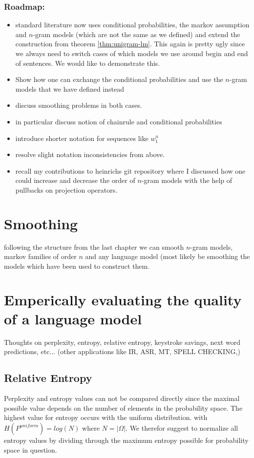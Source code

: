 \documentclass[•]{book}
\begin{document}
\subsection{Roadmap:}
\begin{itemize}
\item standard literature now uses conditional probabilities, the markov assumption and $n$-gram models (which are not the same as we defined) and extend the construction from theorem \ref{thm:unigram-lm}. This again is pretty ugly since we always need to switch cases of which models we use around begin and end of sentences. We would like to demonstrate this.
\item Show how one can exchange the conditional probabilities and use the $n$-gram models that we have defined instead
\item discuss smoothing problems in both cases.
\item in particular discuss notion of chainrule and conditional probabilities
\item introduce shorter notation for sequences like $w_1^n$
\item resolve slight notation inconsistencies from above. 
\item recall my contributions to heinrichs git repository where I discussed how one could increase and decrease the order of $n$-gram models with the help of pullbacks on projection operators. 
\end{itemize}

\chapter{Smoothing}
following the structure from the last chapter we can smooth $n$-gram models, markov families of order $n$ and any language model (most likely be smoothing the models which have been used to construct them. 

\chapter{Emperically evaluating the quality of a language model}
Thoughts on perplexity, entropy, relative entropy, keystroke savings, next word predictions, etc... (other applications like IR, ASR, MT, SPELL CHECKING,) 

\section{Relative Entropy}
Perplexity and entropy values can not be compared directly since the maximal possible value depends on the number of elements in the probability space.
The highest value for entropy occurs with the uniform distribution. with $H(P^{uniform})=log(N)$ where $N = |\Omega|$. 
We therefor suggest to normalize all entropy values by dividing through the maximum entropy possible for probability space in question. 
\end{document}
